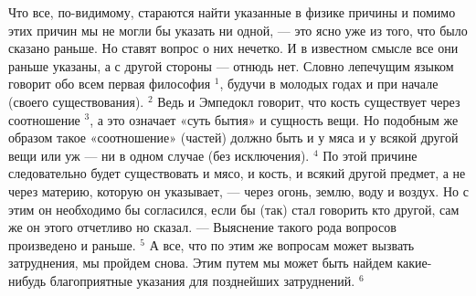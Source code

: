 \documentclass[oneside, 17pt, dvipsnames]{extbook}
\begin{document}
Что все, по-видимому, стараются найти указанные в физике причины и помимо этих причин мы не могли бы указать ни одной, — это ясно уже из того, что было сказано раньше. Но ставят вопрос о них нечетко. И в известном смысле все они раньше указаны, а с другой стороны — отнюдь нет. Словно лепечущим языком говорит обо всем первая философия $^1$, будучи в молодых годах и при начале (своего существования). $^2$ Ведь и Эмпедокл говорит, что кость существует через соотношение $^3$, а это означает «суть бытия» и сущность вещи. Но подобным же образом такое «соотношение» (частей) должно быть и у мяса и у всякой другой вещи или уж — ни в одном случае (без исключения). $^4$ По этой причине следовательно будет существовать и мясо, и кость, и всякий другой предмет, а не через материю, которую он указывает, — через огонь, землю, воду и воздух. Но с этим он необходимо бы согласился, если бы (так) стал говорить кто другой, сам же он этого отчетливо но сказал. — Выяснение такого рода вопросов произведено и раньше. $^5$ А все, что по этим же вопросам может вызвать затруднения, мы пройдем снова. Этим путем мы может быть найдем какие-нибудь благоприятные указания для позднейших затруднений. $^6$
\end{document}
